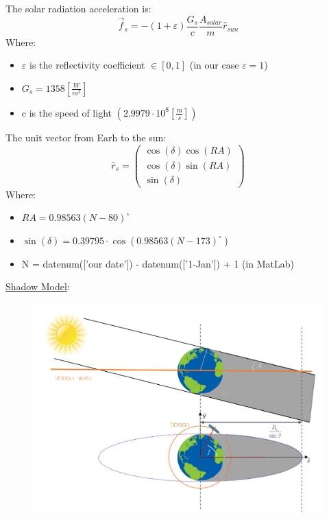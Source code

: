 \documentclass[11pt, a4paper]{article}
\begin{document}
\begin{itemize}
\begin{enumerate}
        The solar radiation acceleration is:
        \begin{equation}
            \vec{f}_s = -(1+\varepsilon)\frac{G_s}{c}\frac{A_{solar}}{m}\hat{r}_{sun}
        \end{equation}
        Where:
        \begin{itemize}
            \item $\varepsilon$ is the reflectivity coefficient $\in[0,1]$ (in our case $\varepsilon = 1$)
            \item $G_s = 1358 \left[\frac{W}{m^2}\right]$ 
            \item c is the speed of light $\left(2.9979\cdot10^8\left[\frac{m}{s}\right]\right)$
        \end{itemize}
        The unit vector from Earh to the sun:
        \begin{equation}
            \hat{r}_s = \begin{pmatrix}
                \cos(\delta)\cos(RA)\\
                \cos(\delta)\sin(RA)\\
                \sin(\delta)
            \end{pmatrix}
        \end{equation}
        Where:
        \begin{itemize}
            \item $RA = 0.98563(N-80)^\circ$
            \item $\sin(\delta) = 0.39795\cdot\cos\left(0.98563(N-173)^\circ\right)$
            \item N = datenum(['our date']) - datenum(['1-Jan']) + 1 (in MatLab)
        \end{itemize}
        \newpage
        \underline{Shadow Model}:
        \begin{figure}[H]
        \begin{center}
        \includegraphics[width=.8\textwidth]{images/shadow model.png}

\end{center}
\end{figure}
\end{enumerate}
\end{itemize}
\end{document}
